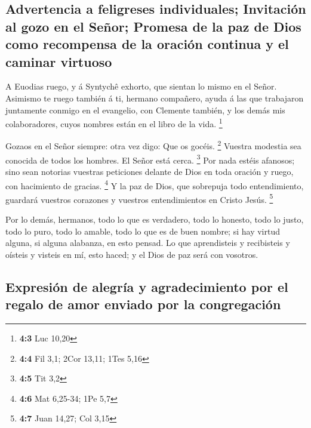 \hypertarget{advertencia-a-feligreses-individuales-invitaciuxf3n-al-gozo-en-el-seuxf1or-promesa-de-la-paz-de-dios-como-recompensa-de-la-oraciuxf3n-continua-y-el-caminar-virtuoso}{%
\subsection{Advertencia a feligreses individuales; Invitación al gozo en
el Señor; Promesa de la paz de Dios como recompensa de la oración
continua y el caminar
virtuoso}\label{advertencia-a-feligreses-individuales-invitaciuxf3n-al-gozo-en-el-seuxf1or-promesa-de-la-paz-de-dios-como-recompensa-de-la-oraciuxf3n-continua-y-el-caminar-virtuoso}}

 A Euodias ruego, y á Syntychê exhorto, que sientan lo mismo
en el Señor.  Asimismo te ruego también á ti, hermano
compañero, ayuda á las que trabajaron juntamente conmigo en el
evangelio, con Clemente también, y los demás mis colaboradores, cuyos
nombres están en el libro de la vida. \footnote{\textbf{4:3} Luc 10,20}

 Gozaos en el Señor siempre: otra vez digo: Que os gocéis.
\footnote{\textbf{4:4} Fil 3,1; 2Cor 13,11; 1Tes 5,16} 
Vuestra modestia sea conocida de todos los hombres. El Señor está cerca.
\footnote{\textbf{4:5} Tit 3,2}  Por nada estéis afanosos;
sino sean notorias vuestras peticiones delante de Dios en toda oración y
ruego, con hacimiento de gracias. \footnote{\textbf{4:6} Mat 6,25-34;
  1Pe 5,7}  Y la paz de Dios, que sobrepuja todo
entendimiento, guardará vuestros corazones y vuestros entendimientos en
Cristo Jesús. \footnote{\textbf{4:7} Juan 14,27; Col 3,15}

 Por lo demás, hermanos, todo lo que es verdadero, todo lo
honesto, todo lo justo, todo lo puro, todo lo amable, todo lo que es de
buen nombre; si hay virtud alguna, si alguna alabanza, en esto pensad.
 Lo que aprendisteis y recibisteis y oísteis y visteis en
mí, esto haced; y el Dios de paz será con vosotros.

\hypertarget{expresiuxf3n-de-alegruxeda-y-agradecimiento-por-el-regalo-de-amor-enviado-por-la-congregaciuxf3n}{%
\subsection{Expresión de alegría y agradecimiento por el regalo de amor
enviado por la
congregación}\label{expresiuxf3n-de-alegruxeda-y-agradecimiento-por-el-regalo-de-amor-enviado-por-la-congregaciuxf3n}}

